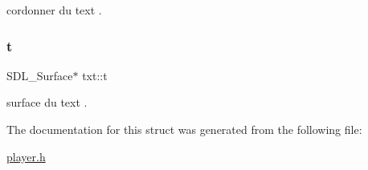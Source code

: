 cordonner du text . \mbox{\label{structtxt_aef6639e1518ba55ba49b1cc0e41b7439}} 
\subsubsection{\texorpdfstring{t}{t}}
{\footnotesize\ttfamily S\+D\+L\+\_\+\+Surface$\ast$ txt\+::t}

surface du text . 

The documentation for this struct was generated from the following file\+:\begin{DoxyCompactItemize}
\item 
\hyperlink{player_8h}{player.\+h}\end{DoxyCompactItemize}
